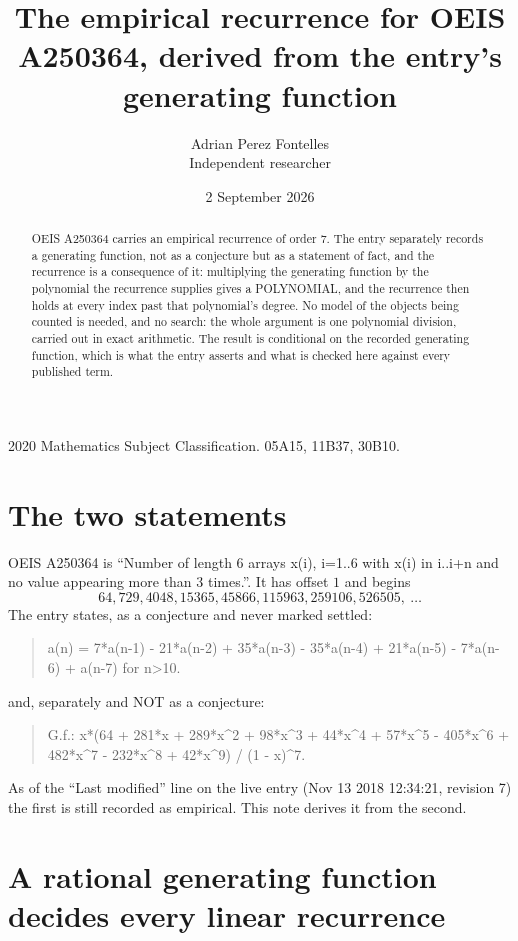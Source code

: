 \documentclass[11pt,a4paper]{article}
\title{The empirical recurrence for OEIS A250364, derived from the entry's generating function}
\author{Adrian Perez Fontelles\\ \small Independent researcher}
\date{2 September 2026}
\theoremstyle{plain}
\theoremstyle{definition}
\begin{document}
\maketitle

\begin{abstract}
OEIS A250364 carries an empirical recurrence of order $7$. The entry separately records a
generating function, not as a conjecture but as a statement of fact, and the recurrence is a
consequence of it: multiplying the generating function by the polynomial the recurrence
supplies gives a POLYNOMIAL, and the recurrence then holds at every index past that
polynomial's degree. No model of the objects being counted is needed, and no search: the
whole argument is one polynomial division, carried out in exact arithmetic. The result is
conditional on the recorded generating function, which is what the entry asserts and what is
checked here against every published term.
\end{abstract}

\noindent\small 2020 Mathematics Subject Classification. 05A15, 11B37, 30B10.\normalsize

\section{The two statements}

OEIS A250364 is ``Number of length 6 arrays x(i), i=1..6 with x(i) in i..i+n and no value appearing more than 3 times.''. It has offset $1$ and begins
\[
64, 729, 4048, 15365, 45866, 115963, 259106, 526505,\ \dots
\]
The entry states, as a conjecture and never marked settled:
\begin{quote}
a(n) = 7*a(n-1) - 21*a(n-2) + 35*a(n-3) - 35*a(n-4) + 21*a(n-5) - 7*a(n-6) + a(n-7) for n>10.
\end{quote}
and, separately and NOT as a conjecture:
\begin{quote}
G.f.: x*(64 + 281*x + 289*x\^{}2 + 98*x\^{}3 + 44*x\^{}4 + 57*x\^{}5 - 405*x\^{}6 + 482*x\^{}7 - 232*x\^{}8 + 42*x\^{}9) / (1 - x)\^{}7.
\end{quote}
As of the ``Last modified'' line on the live entry (Nov 13 2018 12:34:21, revision 7) the first is still
recorded as empirical. This note derives it from the second.

\section{A rational generating function decides every linear recurrence}
\end{document}
